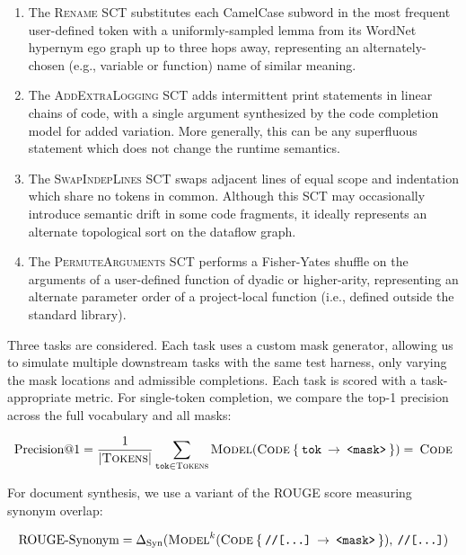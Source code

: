 \documentclass[usenames,dvipsnames]{article} %
\begin{document}
  \begin{enumerate}[itemsep=1ex]
    \item The \textsc{Rename} SCT substitutes each CamelCase subword in the most frequent user-defined token with a uniformly-sampled lemma from its WordNet hypernym ego graph up to three hops away, representing an alternately-chosen (e.g., variable or function) name of similar meaning.
    \item The \textsc{AddExtraLogging} SCT adds intermittent print statements in linear chains of code, with a single argument synthesized by the code completion model for added variation. More generally, this can be any superfluous statement which does not change the runtime semantics.
    \item The \textsc{SwapIndepLines} SCT swaps adjacent lines of equal scope and indentation which share no tokens in common. Although this SCT may occasionally introduce semantic drift in some code fragments, it ideally represents an alternate topological sort on the dataflow graph.
    \item The \textsc{PermuteArguments} SCT performs a Fisher-Yates shuffle on the arguments of a user-defined function of dyadic or higher-arity, representing an alternate parameter order of a project-local function (i.e., defined outside the standard library).
  \end{enumerate}

  Three tasks are considered. Each task uses a custom mask generator, allowing us to simulate multiple downstream tasks with the same test harness, only varying the mask locations and admissible completions. Each task is scored with a task-appropriate metric. For single-token completion, we compare the top-1 precision across the full vocabulary and all masks:

  \begin{equation*}
    \text{Precision@1} = \frac{1}{{|\textsc{Tokens}|}}\sum_{\texttt{tok}\in \textsc{Tokens}}\textsc{Model}(\textsc{Code}\:\{\:\texttt{tok}\:\rightarrow\:\texttt{<mask>}\:\}) = \:\textsc{Code}
  \end{equation*}

  For document synthesis, we use a variant of the ROUGE score measuring synonym overlap:

  \begin{equation*}
    \text{ROUGE-Synonym} = \Delta_{\text{Syn}}(\textsc{Model}^{k}(\textsc{Code}\:\{\:\texttt{//[...]}\:\rightarrow\:\texttt{<mask>}\:\}), \:\texttt{//[...]})
  \end{equation*}
\end{document}
